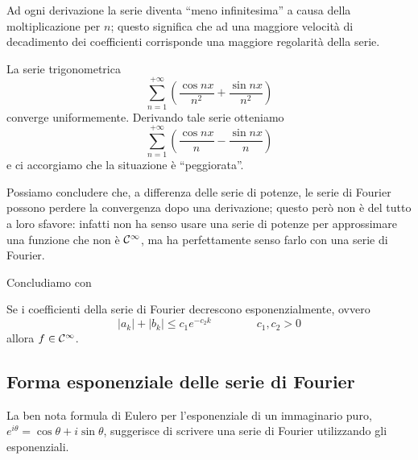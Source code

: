 Ad ogni derivazione la serie diventa ``meno infinitesima'' a causa della moltiplicazione per $n$; questo significa che ad una maggiore velocità di decadimento dei coefficienti corrisponde una maggiore regolarità della serie.

\begin{exa}
La serie trigonometrica
$$
\sum_{n=1}^{+\infty}\left(\frac{\cos nx}{n^2}+\frac{\sin nx}{n^2}\right)
$$
converge uniformemente. Derivando tale serie otteniamo
$$
\sum_{n=1}^{+\infty}\left(\frac{\cos nx}{n}-\frac{\sin nx}{n}\right)
$$
e ci accorgiamo che la situazione è ``peggiorata''.
\end{exa}
Possiamo concludere che, a differenza delle serie di potenze, le serie di Fourier possono perdere la convergenza dopo una derivazione; questo però non è del tutto a loro sfavore: infatti non ha senso usare una serie di potenze per approssimare una funzione che non è $\mathcal{C}^{\infty}$, ma ha perfettamente senso farlo con una serie di Fourier.

Concludiamo con 
\begin{thm}
Se i coefficienti della serie di Fourier decrescono esponenzialmente, ovvero 
$$
|a_k|+|b_k|\leq c_1e^{-c_2k} \qquad \qquad c_1,c_2>0
$$
allora $f\in\mathcal{C}^\infty$.
\end{thm}

\subsection{Forma esponenziale delle serie di Fourier}

La ben nota formula di Eulero per l'esponenziale di un immaginario puro, $e^{i\theta}=\cos\theta+i\sin\theta$, suggerisce di scrivere una serie di Fourier utilizzando gli esponenziali.

